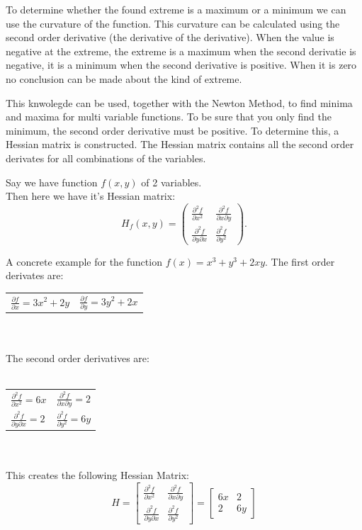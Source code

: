 \documentclass[journal]{IEEEtran}
\begin{document}
To determine whether the found extreme is a maximum or a minimum we can use the curvature of the function. This curvature can be calculated using the second order derivative (the derivative of the derivative). When the value is negative at the extreme, the extreme is a maximum when the second derivatie is negative, it is a minimum when the second derivative is positive. When it is zero no conclusion can be made about the kind of extreme.

This knwolegde can be used, together with the Newton Method, to find minima and maxima for multi variable functions. To be sure that you only find the minimum, the second order derivative must be positive. To determine this, a Hessian matrix is constructed. The Hessian matrix contains all the second order derivates for all combinations of the variables.

Say we have function $f(x,y)$ of 2 variables.\\

Then here we have it's Hessian matrix:
\[
H_f(x,y) =
\begin{pmatrix}
\frac{\partial^2 f}{\partial x^2} & \frac{\partial^2 f}{\partial x \partial y} \\[1em]
\frac{\partial^2 f}{\partial y \partial x} & \frac{\partial^2 f}{\partial y^2}
\end{pmatrix}.
\]

A concrete example for the function $f(x) = x^3+y^3+2xy$.
The first order derivates are:\\

\begin{tabular}{l{}l{3cm}}
\( \frac{\partial f}{\partial x} = 3x^2 + 2y \) & \( \frac{\partial f}{\partial y} = 3y^2 + 2x \) \\
\end{tabular}
\\
\\
The second order derivatives are:
\\
\\
\begin{tabular}{l{}l{3cm}}
\( \frac{\partial^2 f}{\partial x^2} = 6x \) &\( \frac{\partial^2 f}{\partial x \partial y} = 2 \) \\
\( \frac{\partial^2 f}{\partial y \partial x} = 2 \) &\( \frac{\partial^2 f}{\partial y^2} = 6y \)
\end{tabular}
\\
\\

This creates the following Hessian Matrix:
\[
H = \begin{bmatrix}
\frac{\partial^2 f}{\partial x^2} & \frac{\partial^2 f}{\partial x \partial y} \\
\frac{\partial^2 f}{\partial y \partial x} & \frac{\partial^2 f}{\partial y^2}
\end{bmatrix}
= \begin{bmatrix}
6x & 2 \\
2 & 6y
\end{bmatrix}
\]
\end{document}
